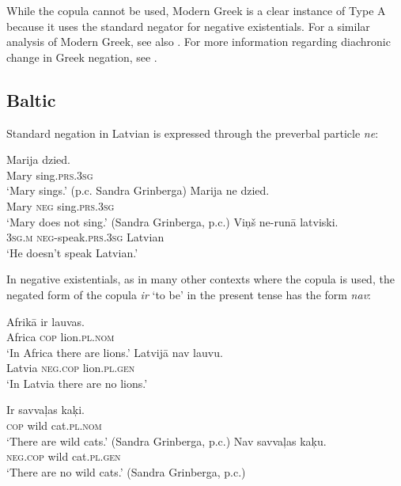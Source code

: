 \documentclass[output=paper,colorlinks,citecolor=brown]{langscibook}
\begin{document}
\begin{paperappendix}
\begin{unindented}
While the copula cannot be used, Modern Greek is a clear instance of Type A
because it uses the standard negator for negative existentials. For a
similar analysis of Modern Greek, see also
\citet[115--116]{Veselinova2013}.  For more information regarding
diachronic change in Greek negation, see \citet{KiparskyCondoravdi2006-ieur}. 

\subsection{Baltic}%


Standard negation in Latvian is expressed through the preverbal particle \textit{ne}: 
%
\begin{exe}\ex \gll Marija dzied. \\
Mary sing.\textsc{prs.3sg} \\
    \glt `Mary sings.' (p.c. Sandra Grinberga)
\ex \gll Marija   ne   dzied. \\
Mary \textsc{neg} sing.\textsc{prs.3sg} \\
    \glt `Mary does not sing.' (Sandra Grinberga, p.c.)
\ex \gll Viņš ne-runā latviski. \\
\textsc{3sg}.\textsc{m} \textsc{neg}-speak.\textsc{prs.3sg} Latvian \\
    \glt `He doesn't speak Latvian.' \citep[164]{Mathiassen1997}
    \end{exe}

In negative existentials, as in many other contexts where the copula is used, the negated form of the copula \textit{ir} `to be' in the present tense has the form \textit{nav}: 
%
\begin{exe}\ex \gll Afrikā ir lauvas. \\
Africa \textsc{cop} lion.\textsc{pl.nom} \\
    \glt `In Africa there are lions.' \citep[164]{Mathiassen1997}
\ex \gll Latvijā nav lauvu. \\
Latvia \textsc{neg.cop} lion.\textsc{pl.gen} \\
    \glt `In Latvia there are no lions.' \citep[164]{Mathiassen1997}
\ex\begin{xlist}
\ex \gll Ir savvaļas kaķi. \\
\textsc{cop} wild cat.\textsc{pl.nom} \\
    \glt `There are wild cats.' (Sandra Grinberga, p.c.)
\ex\gll Nav savvaļas kaķu.\\
\textsc{neg}.\textsc{cop} wild cat.\textsc{pl.gen}\\
\glt `There are no wild cats.' (Sandra Grinberga, p.c.)
    \end{xlist}\end{exe}


\end{unindented}
\end{paperappendix}
\end{document}
